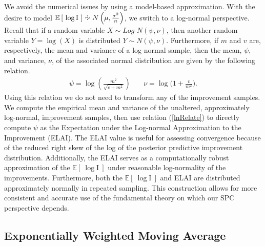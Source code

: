 \documentclass[12pt]{article}
\newcommand{\E}[1]{
        \mathbb{E}\left[~#1~\right]
}
\newcommand*{\approxdist}{\mathrel{\vcenter{\offinterlineskip
\vskip-.25ex\hbox{\hskip.55ex$\cdot$}\vskip-.25ex\hbox{$\sim$}
\vskip-.5ex\hbox{\hskip.55ex$\cdot$}}}}
\begin{document}
%
%

%
We avoid the numerical issues by using a model-based approximation. 
%
With the desire to model $\mathbb{E}\left[~\log\text{I}~\right] \approxdist N\left(\mu, \frac{\sigma^2}{n}\right)$, we switch to a log-normal perspective.   
%
Recall that if a random variable \mbox{$X\sim Log$-$N(\psi, \nu)$,} then another random variable $Y=\log(X)$ is distributed $Y\sim N(\psi, \nu)$.
Furthermore, if $m$ and $v$ are, respectively, the mean and variance of a log-normal sample, then the mean, $\psi$, and variance, $\nu$, of the associated normal distribution are given by the following relation.
%
\begin{eqnarray}
\psi = \log\left( \frac{m^2}{\sqrt{v+m^2}} \right) &~&  \nu = \log\bigg( 1+ \frac{v}{m^2} \bigg).
\label{lnRelate}
\end{eqnarray}
%
Using this relation we do not need to transform any of the improvement samples.
%
We compute the empirical mean and variance of the unaltered, approximately log-normal, improvement samples, then use relation (\ref{lnRelate}) to directly compute $\psi$ as the Expectation under the Log-normal Approximation to the Improvement (ELAI).
The ELAI value is useful for assessing convergence because of the reduced right skew of the log of the posterior predictive improvement distribution.
%
Additionally, the ELAI serves as a computationally robust approximation of the $\E{\log\text{I}}$ under reasonable log-normality of the improvements.
Furthermore, both the $\E{\log\text{I}}$ and ELAI are distributed approximately normally in repeated sampling.
%
This construction allows for more consistent and accurate use of the fundamental theory on which our SPC perspective depends.


%
%
\subsection{Exponentially Weighted Moving Average}
%
%
\end{document}
